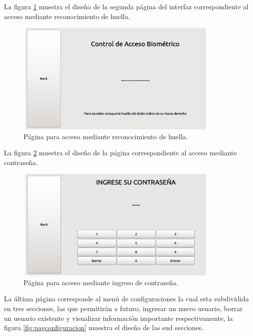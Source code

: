 La figura \ref{fig:paginabio} muestra el diseño de la segunda página del interfaz correspondiente al acceso mediante reconocimiento de huella.
\begin{figure}[h]
	\centering
	\includegraphics[height=5.5cm,width=10cm]{./Figures/paginabio.png}
	\caption{Página para acceso mediante reconocimiento de huella.}
	\label{fig:paginabio}
\end{figure}



La figura \ref{fig:pagcontrasena} muestra el diseño de la página correspondiente al acceso mediante contraseña.
\begin{figure}[H]
	\centering
	\includegraphics[height=5.5cm,width=10cm]{./Figures/pagcontrasena.png}
	\caption{Página para acceso mediante ingreso de contraseña.}
	\label{fig:pagcontrasena}
\end{figure}




La última página corresponde al menú de configuraciones la cual esta subdividida en tres secciones, las que permitirán a futuro, ingresar un nuevo usuario, borrar un usuario existente y visualizar información importante respectivamente, la figura \ref{fig:pagconfiguracion} muestra el diseño de las sud secciones.

